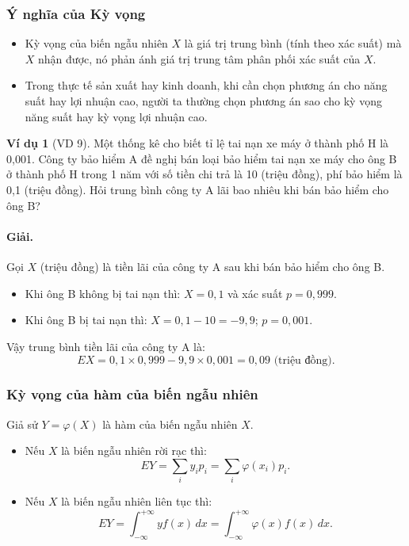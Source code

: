 \documentclass[12pt,a4paper]{article}
\theoremstyle{definition}
\newtheorem{vidu}{Ví dụ}[section]
\begin{document}
\subsubsection{Ý nghĩa của Kỳ vọng}
\begin{itemize}
    \item Kỳ vọng của biến ngẫu nhiên $X$ là giá trị trung bình (tính theo xác suất) mà $X$ nhận được, nó phản ánh giá trị trung tâm phân phối xác suất của $X$.
    \item Trong thực tế sản xuất hay kinh doanh, khi cần chọn phương án cho năng suất hay lợi nhuận cao, người ta thường chọn phương án sao cho kỳ vọng năng suất hay kỳ vọng lợi nhuận cao.
\end{itemize}

\begin{vidu}[VD 9]
Một thống kê cho biết tỉ lệ tai nạn xe máy ở thành phố H là 0,001. Công ty bảo hiểm A đề nghị bán loại bảo hiểm tai nạn xe máy cho ông B ở thành phố H trong 1 năm với số tiền chi trả là 10 (triệu đồng), phí bảo hiểm là 0,1 (triệu đồng). Hỏi trung bình công ty A lãi bao nhiêu khi bán bảo hiểm cho ông B?

\paragraph{Giải.} Gọi $X$ (triệu đồng) là tiền lãi của công ty A sau khi bán bảo hiểm cho ông B.
\begin{itemize}
    \item Khi ông B không bị tai nạn thì: $X = 0{,}1$ và xác suất $p = 0{,}999$.
    \item Khi ông B bị tai nạn thì: $X = 0{,}1 - 10 = -9{,}9$; $p = 0{,}001$.
\end{itemize}
Vậy trung bình tiền lãi của công ty A là:
\[
EX = 0{,}1 \times 0{,}999 - 9{,}9 \times 0{,}001 = 0{,}09 \text{ (triệu đồng)}.
\]
\end{vidu}

\subsubsection{Kỳ vọng của hàm của biến ngẫu nhiên}
Giả sử $Y = \varphi(X)$ là hàm của biến ngẫu nhiên $X$.
\begin{itemize}
    \item Nếu $X$ là biến ngẫu nhiên rời rạc thì:
    \[
    EY = \sum_i y_i p_i = \sum_i \varphi(x_i) p_i.
    \]
    \item Nếu $X$ là biến ngẫu nhiên liên tục thì:
    \[
    EY = \int_{-\infty}^{+\infty} y f(x)\,dx = \int_{-\infty}^{+\infty} \varphi(x) f(x)\,dx.
    \]
\end{itemize}
\end{document}

